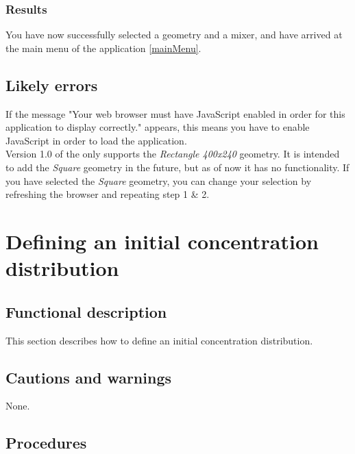\subsubsection{Results}
You have now successfully selected a geometry and a mixer, and have arrived at the main menu of the application \ref{mainMenu}.


\subsection{Likely errors}
If the message "Your web browser must have JavaScript enabled in order for this application to display correctly." appears, this means you have to enable JavaScript in order to load the application.\\

\noindent Version 1.0 of the \applicationname{} only supports the \emph{Rectangle 400x240} geometry. It is intended to add the \emph{Square} geometry in the future, but as of now it has no functionality. If you have selected the \emph{Square} geometry, you can change your selection by refreshing the browser and repeating step 1 \& 2.\\



\section{Defining an initial concentration distribution}
\label{sec:defineDist}

\subsection{Functional description}
This section describes how to define an initial concentration distribution.

\subsection{Cautions and warnings}
None.

\subsection{Procedures}
